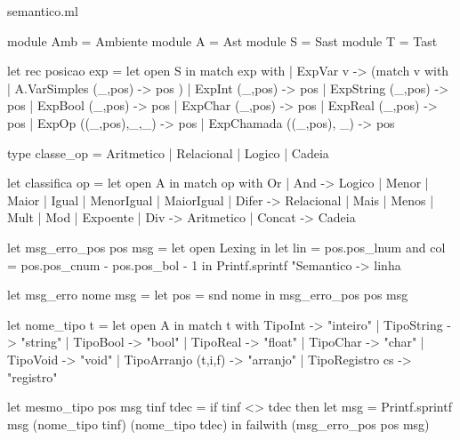 \documentclass[12pt,a4paper,twoside]{article}
\begin{document}
semantico.ml
\begin{terminal}
module Amb = Ambiente
module A = Ast
module S = Sast
module T = Tast

let rec posicao exp = let open S in
  match exp with
  | ExpVar v -> (match v with
      | A.VarSimples (_,pos) -> pos
    )
  | ExpInt (_,pos) -> pos
  | ExpString  (_,pos) -> pos
  | ExpBool (_,pos) -> pos
  | ExpChar (_,pos) -> pos
  | ExpReal (_,pos) -> pos
  | ExpOp ((_,pos),_,_)  -> pos
  | ExpChamada ((_,pos), _) -> pos

type classe_op = Aritmetico | Relacional | Logico | Cadeia

let classifica op =
  let open A in
  match op with
    Or
  | And  -> Logico
  | Menor
  | Maior
  | Igual
  | MenorIgual
  | MaiorIgual
  | Difer -> Relacional
  | Mais
  | Menos
  | Mult
  | Mod
  | Expoente
  | Div -> Aritmetico
  | Concat -> Cadeia

let msg_erro_pos pos msg =
  let open Lexing in
  let lin = pos.pos_lnum
  and col = pos.pos_cnum - pos.pos_bol - 1 in
  Printf.sprintf "Semantico -> linha %

let msg_erro nome msg =
  let pos = snd nome in
  msg_erro_pos pos msg

let nome_tipo t =
  let open A in
    match t with
      TipoInt -> "inteiro"
    | TipoString -> "string"
    | TipoBool -> "bool"
    | TipoReal -> "float"
    | TipoChar -> "char"
    | TipoVoid -> "void"
    | TipoArranjo (t,i,f) -> "arranjo"
    | TipoRegistro cs -> "registro"

let mesmo_tipo pos msg tinf tdec =
  if tinf <> tdec
  then
    let msg = Printf.sprintf msg (nome_tipo tinf) (nome_tipo tdec) in
    failwith (msg_erro_pos pos msg)


\end{terminal}
\end{document}
